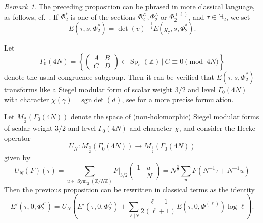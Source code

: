 \documentclass[reqno,oneside]{amsart}
\theoremstyle{plain}
\theoremstyle{remark}
\newtheorem{remark}[theorem]{Remark}
\numberwithin{theorem}{section}
\newcommand{\bbH}{\mathbb H}
\newcommand{\bbZ}{\mathbb Z}
\newcommand{\calL}{\mathcal L}
\newcommand{\psm}[1]{\left( \begin{smallmatrix}#1 \end{smallmatrix} \right)}
\DeclareMathOperator{\Sym}{Sym}
\DeclareMathOperator{\Sp}{Sp}
\begin{document}
	\begin{remark}
		The preceding proposition can be phrased in more classical language, as follows, cf.\  . If $\Phi^*_2$ is one of the sections $\Phi^{\calL}_2, \Phi^{L}_2$ or $\Phi^{(\ell)}_2$, and $\tau \in \bbH_2$, we set
		\begin{equation}
		E(\tau, s, \Phi^*_2) = \det (v )^{-\frac34} E(g_{\tau}, s, \Phi^*_2).
		\end{equation}

	
		
		Let
			\begin{equation}
				\Gamma_0(4N) = \left\{  \begin{pmatrix} A & B \\ C & D \end{pmatrix} \in \Sp_r(\bbZ) \ | \ C \equiv 0 \pmod{4N} \right\}
			\end{equation}
		denote the usual congruence subgroup. Then it can be verified that $E(\tau, s, \Phi^*_2)$ transforms like a Siegel modular form of scalar weight $3/2$ and level $\Gamma_0(4N)$ with character $\chi(\gamma) = \mathrm{sgn}\det (d)$, see \cite[\S 8.5.6]{KRYbook} for a more precise formulation.
	
		Let $M_{\frac32}(\Gamma_0(4N))$ denote the space of (non-holomorphic) Siegel modular forms of scalar weight $3/2$ and level $\Gamma_0(4N)$ and character $\chi$, and consider the Hecke operator
		\begin{equation}
		U_N \colon M_{\frac32}(\Gamma_0(4N)) \to M_{\frac32}(\Gamma_0(4N))
		\end{equation}
		given by
		\begin{equation}
		U_N (F)(\tau) = \sum_{u \in \Sym_2(\bbZ/N\bbZ)} F|_{3/2} \psm{1 & u \\ & N} = N^{\frac32} \sum_u F(N^{-1}  \tau + N^{-1} u)
		\end{equation}
		Then the previous proposition can be rewritten in classical terms as the identity
		\begin{equation} \label{eqUp1}
		E'(\tau,0,\Phi^{\calL}_2) = U_N \left( E'(\tau, 0, \Phi^L_2) + \sum_{\ell|N} \frac{\ell - 1}{2 (\ell + 1)} E(\tau,0, \Phi^{(\ell)}) \log \ell \right).
		\end{equation}
		
	\end{remark}
	
	
	
	
	
	
	
	
	
	
	
\end{document}
